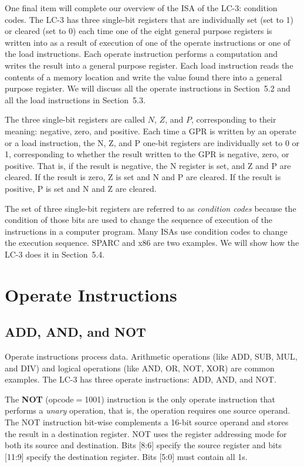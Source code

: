 \documentclass{patt}
\begin{document}
One final item will complete our overview of the ISA
of the LC-3: condition codes.
The LC-3 has three single-bit registers that are individually set (set to 1)
or cleared (set to 0) each time one of the eight general purpose registers is
written into as a result of execution of one of the operate instructions or one 
of the load instructions.  Each operate instruction performs a computation 
and writes the result into a general purpose register.  Each load instruction 
reads the contents of a memory location and write the value found there into 
a general purpose register.  We will discuss all the operate instructions in 
Section~5.2 and all the load instructions in Section~5.3.  

The three single-bit registers are called
$N$, $Z$, and $P$, corresponding to their meaning: negative, zero,
and positive. Each time a GPR is written by an operate or a load instruction, 
the N, Z, and P one-bit registers are individually set to 0 or 1, corresponding 
to whether the result written to the GPR is negative, zero, or positive. 
That is, if the result is negative, the N register is set, and Z and P are
cleared. If the result is zero, Z is set and N and P are cleared.
If the result is positive, P is set and N and Z are cleared.

The set of three single-bit registers are referred to as {\em condition codes} 
because the condition of those bits are used to change the sequence of 
execution of the instructions in a computer program.  Many ISAs use condition 
codes to change the execution sequence.  SPARC and x86 are two examples.  We 
will show how the LC-3 does it in Section~5.4.

\section{Operate Instructions}

\subsection{ADD, AND, and NOT}

Operate instructions process data. Arithmetic operations
(like ADD, SUB, MUL, and DIV) and logical operations (like AND, OR,
NOT, XOR) are common examples. The LC-3
has three operate instructions: ADD, AND, and NOT.


The {\bf NOT} (opcode{}${}={}${}1001) instruction is the only
operate instruction that performs a {\em unary} operation,
that is, the operation requires one source operand. The NOT
instruction bit-wise complements a 16-bit source operand and stores the 
result in a destination register. NOT uses the register addressing mode for 
both its source and destination. Bits [8:6] specify the source register
and bits [11:9] specify the destination register. Bits [5:0]
must contain all 1s.
\end{document}
